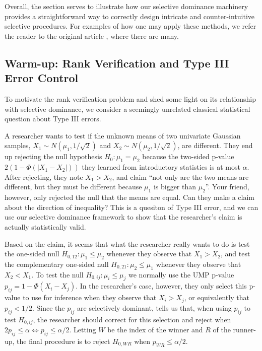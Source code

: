 \documentclass{article}
\begin{document}
Overall, the section serves to illustrate how our selective dominance machinery provides a straightforward way to correctly design intricate and counter-intuitive selective procedures. For examples of how one may apply these methods, we refer the reader to the original article \cite{Hung2019}, where there are many. 

\subsection{Warm-up: Rank Verification and Type III Error Control}

To motivate the rank verification problem and shed some light on its relationship with selective dominance, we consider a seemingly unrelated classical statistical question about Type III errors. 

A researcher wants to test if the unknown means of two univariate Gaussian samples, $X_1 \sim N(\mu_1, 1/\sqrt{2})$ and $X_2 \sim N(\mu_2, 1/\sqrt{2})$, are different. They end up rejecting the null hypothesis $H_0: \mu_1 = \mu_2$ because the two-sided p-value $2(1 - \Phi(|X_1 - X_2|))$ they learned from introductory statistics is at most $\alpha$. After rejecting, they note $X_1 > X_2$, and claim ``not only are the two means are different, but they must be different because $\mu_1$ is bigger than $\mu_2$''. Your friend, however, only rejected the null that the means are equal. Can they make a claim about the direction of inequality? This is a quesiton of Type III error, and we can use our selective dominance framework to show that the researcher's claim is actually statistically valid. 

Based on the claim, it seems that what the researcher really wants to do is test the one-sided null $H_{0, 12} : \mu_1 \leq \mu_2$ whenever they observe that $X_1 > X_2$, and test the complementary one-sided null $H_{0, 21} : \mu_2 \leq \mu_1$ whenever they observe that $X_2 < X_1$. To test the null $H_{0, ij} : \mu_i \leq \mu_j$ we normally use the UMP p-value $p_{ij} = 1 - \Phi(X_i - X_j)$. In the researcher's case, however, they only select this p-value to use for inference when they observe that $X_i > X_{j}$, or equivalently that $p_{ij} < 1/2$. Since the $p_{ij}$ are selectively dominant,  tells us that, when using $p_{ij}$ to test $H_{0, ij}$, the researcher should correct for this selection and reject when $2p_{ij} \leq \alpha \iff p_{ij} \leq \alpha/2$. Letting $W$ be the index of the winner and $R$ of the runner-up, the final procedure is to reject $H_{0, WR}$ when $p_{WR} \leq \alpha/2$. 
\end{document}
